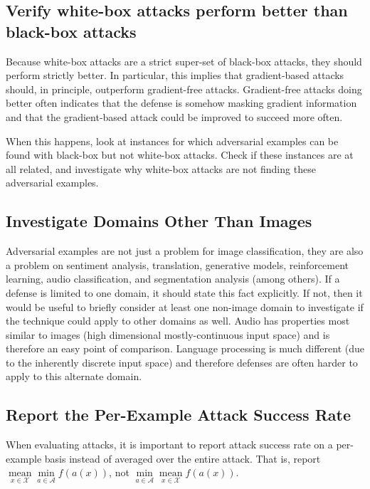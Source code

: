 \documentclass{article} %
\begin{document}
\subsection{Verify white-box attacks perform better than black-box attacks}
\label{sec:whitebox}
Because white-box attacks are a strict super-set of black-box
attacks, they should perform strictly better.
%
In particular, this implies that gradient-based attacks should, in principle, outperform gradient-free attacks.
%
Gradient-free attacks doing
better often indicates that the defense is somehow masking gradient
information and that the gradient-based attack could be
improved to succeed more often.

When this happens, look at instances for which adversarial
examples can be found with black-box but not white-box attacks.
%
Check if these instances are at all related, and investigate why white-box
attacks are not finding these adversarial examples.

\subsection{Investigate Domains Other Than Images}
\label{sec:notimages}

Adversarial examples are not just a problem for image classification,
they are also a problem on sentiment analysis, translation,
generative models, reinforcement learning, audio classification,
and segmentation analysis (among others).
%
If a defense is limited to one domain, it should state this
fact explicitly.
%
If not, then it would be useful to briefly consider at least one
non-image domain to investigate if the technique could apply
to other domains as well.
%
Audio has properties most similar to images (high dimensional
mostly-continuous input space) and is therefore an easy point
of comparison.
%
Language processing is much different (due to the
inherently discrete input space) and therefore defenses are
often harder to apply to this alternate domain.

\subsection{Report the Per-Example Attack Success Rate}
\label{sec:reportmeanmin}

When evaluating attacks, it is important to report attack success rate
on a per-example
basis instead of averaged over the entire attack.
%
That is, report
$\mathop{\text{mean}}\limits_{x \in \mathcal{X}} \min\limits_{a \in \mathcal{A}} f(a(x))$, not
$\mathop{\text{min}}\limits_{a \in \mathcal{A}} \mathop{\text{mean}}\limits_{x \in \mathcal{X}} f(a(x))$.
\end{document}
